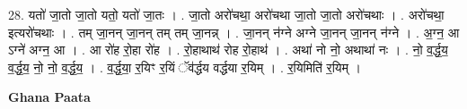 \documentclass[17pt]{extarticle}
\begin{document}
28. यतो॑ जा॒तो जा॒तो यतो॒ यतो॑ जा॒तः । . जा॒तो अरो॑चथा॒ अरो॑चथा जा॒तो जा॒तो अरो॑चथाः । . अरो॑चथा॒ इत्यरो॑चथाः । . तम् जा॒नन् जा॒नन् तम् तम् जा॒नन्न् । . जा॒नन् न॑ग्ने अग्ने जा॒नन् जा॒नन् न॑ग्ने । . अ॒ग्न॒ आ ऽग्ने॑ अग्न॒ आ । . आ रो॑ह रो॒हा रो॑ह । . रो॒हाथाथ॑ रोह रो॒हाथ॑ । . अथा॑ नो नो॒ अथाथा॑ नः । . नो॒ व॒र्द्ध॒य॒ व॒र्द्ध॒य॒ नो॒ नो॒ व॒र्द्ध॒य॒ । . व॒र्द्ध॒या॒ र॒यिꣳ र॒यिं ॅव॑र्द्धय वर्द्धया र॒यिम् । . र॒यिमिति॑ र॒यिम् । \newline

\textbf{Ghana Paata } \newline
\end{document}
